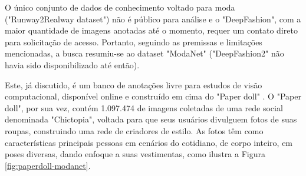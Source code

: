 \documentclass[12pt]{report}
\begin{document}
O único conjunto de dados de conhecimento voltado para moda ("Runway2Realway dataset") não é público para análise e o "DeepFashion", com a maior quantidade de imagens anotadas até o momento, requer um contato direto para solicitação de acesso. Portanto, seguindo as premissas e limitações mencionadas, a busca resumiu-se ao dataset "ModaNet" ("DeepFashion2" não havia sido disponibilizado até então). 

Este, já discutido, é um banco de anotações livre para estudos de visão computacional, disponível online e construído em cima do "Paper doll" \cite{paperdoll}. O "Paper doll", por sua vez, contém 1.097.474 de imagens coletadas de uma rede social denominada "Chictopia", voltada para que seus usuários divulguem fotos de suas roupas, construindo uma rede de criadores de estilo. As fotos têm como características principais pessoas em cenários do cotidiano, de corpo inteiro, em poses diversas, dando enfoque a suas vestimentas, como ilustra a Figura \ref{fig:paperdoll-modanet}. 
\end{document}

